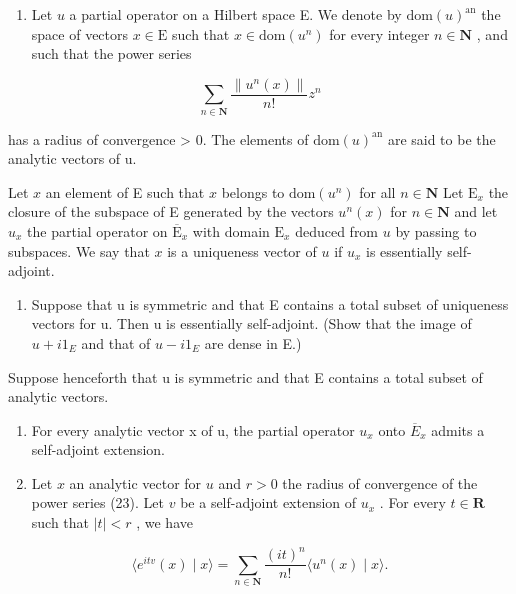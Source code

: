 \begin{enumerate}
\def\labelenumi{\arabic{enumi})}
\setcounter{enumi}{19}
\tightlist
\item
  Let \(u\) a partial operator on a Hilbert space E. We denote by \(\mathrm{dom}(u)^{\mathrm{an}}\) the space of vectors \(x \in \mathrm{E}\) such that \(x \in \mathrm{dom}(u^n)\) for every integer \(n \in \mathbf{N}\) , and such that the power series
\end{enumerate}

\[
\sum_ {n \in \mathbf {N}} \frac {\| u ^ {n} (x) \|}{n !} z ^ {n}\tag{23}
\]

has a radius of convergence \textgreater{} 0. The elements of \(\text{dom}(u)^{\text{an}}\) are said to be the analytic vectors of u.

Let \(x\) an element of E such that \(x\) belongs to \(\mathrm{dom}(u^n)\) for all \(n \in \mathbf{N}\) Let \(\mathrm{E}_x\) the closure of the subspace of E generated by the vectors \(u^n(x)\) for \(n \in \mathbf{N}\) and let \(u_x\) the partial operator on \(\overline{\mathrm{E}}_x\) with domain \(\mathrm{E}_x\) deduced from \(u\) by passing to subspaces. We say that \(x\) is a uniqueness vector of \(u\) if \(u_x\) is essentially self-adjoint.

\begin{enumerate}
\def\labelenumi{\alph{enumi})}
\tightlist
\item
  Suppose that u is symmetric and that E contains a total subset of uniqueness vectors for u. Then u is essentially self-adjoint. (Show that the image of \(u + i1_{E}\) and that of \(u - i1_{E}\) are dense in E.)
\end{enumerate}

Suppose henceforth that u is symmetric and that E contains a total subset of analytic vectors.

\begin{enumerate}
\def\labelenumi{\alph{enumi})}
\setcounter{enumi}{1}
\item
  For every analytic vector x of u, the partial operator \(u_{x}\) onto \(\overline{E}_{x}\) admits a self-adjoint extension.
\item
  Let \(x\) an analytic vector for \(u\) and \(r > 0\) the radius of convergence of the power series (23). Let \(v\) be a self-adjoint extension of \(u_x\) . For every \(t \in \mathbf{R}\) such that \(|t| < r\) , we have
\end{enumerate}

\[
\langle e ^ {i t v} (x) \mid x \rangle = \sum_ {n \in \mathbf {N}} \frac {(i t) ^ {n}}{n !} \langle u ^ {n} (x) \mid x \rangle .
\]

